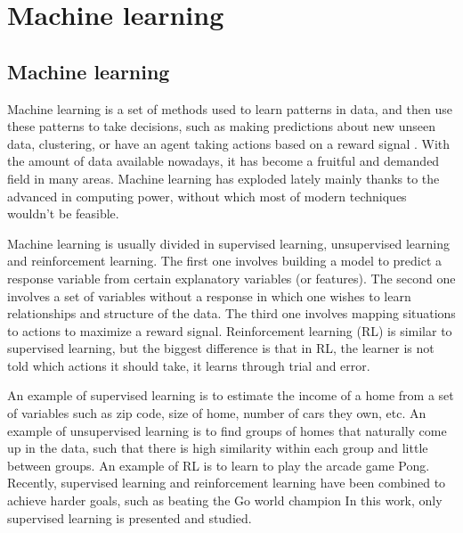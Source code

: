 
\chapter{Machine learning}
\label{ch:machine_learning}




\section{Machine learning}

Machine learning is a set of methods used to learn patterns in data, and then use these patterns to take decisions, such as making predictions about new unseen data,  clustering, or have an agent taking actions based on a reward signal \cite{murphy2012machine} \cite{sutton1998reinforcement}. With the amount of data available nowadays, it has become a fruitful and demanded field in many areas. Machine learning has exploded lately mainly thanks to the advanced in computing power, without which most of modern techniques wouldn't be feasible.

Machine learning is usually divided in supervised learning, unsupervised learning and reinforcement learning. The first one involves building a model to predict a response variable from certain explanatory variables (or features). The second one involves a set of variables without a response in which one wishes to learn relationships and structure of the data. The third one involves mapping situations to actions to maximize a reward signal. Reinforcement learning (RL) is similar to supervised learning, but the biggest difference is that in RL, the learner is not told which actions it should take, it learns through trial and error.

An example of supervised learning is to estimate the income of a home from a set of variables such as zip code, size of home, number of cars they own, etc. An example of unsupervised learning is to find groups of homes that naturally come up in the data, such that there is high similarity within each group and little between groups. An example of RL is to learn to play the arcade game Pong. Recently, supervised learning and reinforcement learning have been combined to achieve harder goals, such as beating the Go world champion \cite{silver2017mastering} In this work, only supervised learning is presented and studied.

